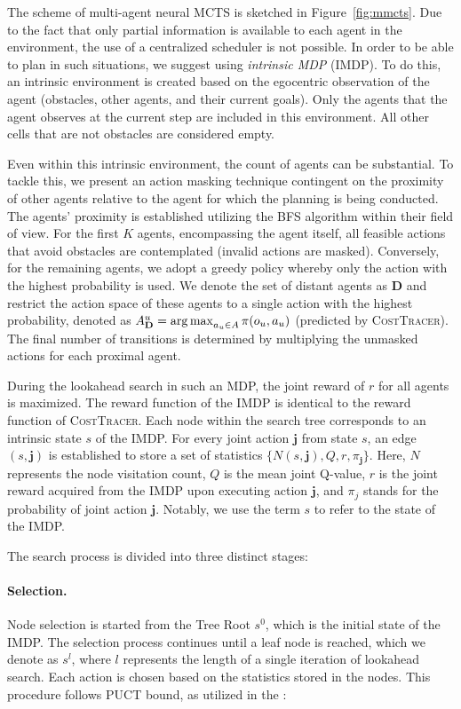 \documentclass[letterpaper]{article} %
\newcommand{\argmax}{\operatornamewithlimits{arg\,max}}  %
\begin{document}
The scheme of multi-agent neural MCTS is sketched in Figure~\ref{fig:mmcts}.
Due to the fact that only partial information is available to each agent in the environment, the use of a centralized scheduler is not possible. In order to be able to plan in such situations, we suggest using \textit{intrinsic MDP} (IMDP). To do this, an intrinsic environment is created based on the egocentric observation of the agent (obstacles, other agents, and their current goals). Only the agents that the agent observes at the current step are included in this environment. All other cells that are not obstacles are considered empty.


Even within this intrinsic environment, the count of agents can be substantial. To tackle this, we present an action masking technique contingent on the proximity of other agents relative to the agent for which the planning is being conducted. The agents' proximity is established utilizing the BFS algorithm within their field of view. For the first $K$ agents, encompassing the agent itself, all feasible actions that avoid obstacles are contemplated (invalid actions are masked). Conversely, for the remaining agents, we adopt a greedy policy whereby only the action with the highest probability is used.
We denote the set of distant agents as $\mathbf{D}$ and restrict the action space of these agents to a single action with the highest probability, denoted as $A_\mathbf{D}^u = \argmax_{a_u \in A} \pi(o_u, a_u)$ (predicted by \textsc{CostTracer}). The final number of transitions is determined by multiplying the unmasked actions for each proximal agent.


During the lookahead search in such an MDP, the joint reward of $r$ for all agents is maximized. The reward function of the IMDP is identical to the reward function of  \textsc{CostTracer}.
Each node within the search tree corresponds to an intrinsic state $s$ of the IMDP. For every joint action $\mathbf{j}$ from state $s$, an edge $(s, \mathbf{j})$ is established to store a set of statistics $\{N(s,\mathbf{j}), Q, r, \pi_\mathbf{j}\}$. Here, $N$ represents the node visitation count, $Q$ is the mean joint Q-value, $r$ is the joint reward acquired from the IMDP upon executing action $\mathbf{j}$, and $\pi_j$ stands for the probability of joint action $\mathbf{j}$. Notably, we use the term $s$ to refer to the state of the IMDP.

The search process is divided into three distinct stages:

\paragraph{Selection.} Node selection is started from the Tree Root $s^0$, which is the initial state of the IMDP. The selection process continues until a leaf node is reached, which we denote as $s^l$, where $l$ represents the length of a single iteration of lookahead search. Each action is chosen based on the statistics stored in the nodes. This procedure follows PUCT bound, as utilized in the \cite{schrittwieser2020mastering}:
\end{document}
